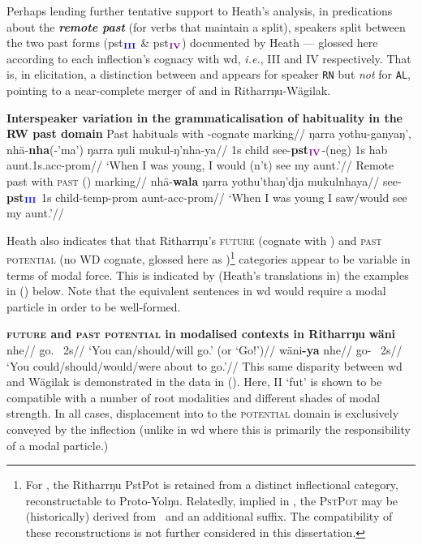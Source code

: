 Perhaps lending further tentative support to Heath's analysis, in predications about the \textbf{\textit{remote past}} (for verbs that maintain a split), speakers split between the two past forms (\gls{pst}$ _{\textbf{\textcolor{blue}{III}}} $ \& \gls{pst}$ _{\textbf{\textcolor{violet}{IV}}} $) documented by Heath --- glossed here according to each inflection's cognacy with \gls{wd}, \textit{i.e.}, \gls{III} and \gls{IV} respectively.
That is, in elicitation, a distinction between \III{} and \IV{} appears for speaker \texttt{RN} but \textit{not} for \texttt{AL}, pointing to a near-complete merger of \III{} and \IV{} in Ritharrŋu-Wägilak.

\pex \textbf{Interspeaker variation in the grammaticalisation of habituality in the RW past domain}
\a\begingl\glpreamble Past habituals with \IV-cognate marking//
 \gla ŋarra yothu-ganyaŋ', nhä-\textbf{nha}(-'ma') ŋarra ŋuli mukul-ŋ'nha-ya//
\glb 1s child see-\textbf{\gls{pst}}$_{\textbf{\textcolor{violet}{IV}}}$-(\gls{neg}) 1s \gls{hab} aunt.1s.\gls{acc}-\gls{prom}//
\glft`When I was young, I would (n't) see my aunt.'\trailingcitation{[RN~20190522]}//\endgl
\a\begingl\glpreamble Remote past with \textsc{past} (\III) marking//
\gla nhä-\textbf{wala} ŋarra yothu'thaŋ'dja mukulnhaya//
\glb see-\textbf{\gls{pst}}$_{\textbf{\textcolor{blue}{III}}}$ 1s child-\gls{temp}-\gls{prom} aunt-\gls{acc}-\gls{prom}//
\glft `When I was young I saw/would see my aunt.'\trailingcitation{[AL~20190522]}//\endgl
\xe




Heath also indicates that that Ritharrŋu's \textsc{future} (cognate with \II) and \textsc{past potential} (no WD cognate, glossed here as \V)\footnote{For \citet{Bowern2009}, the Ritharrŋu \gls{PstPot} is retained from a distinct inflectional category, reconstructable to Proto-Yolŋu. Relatedly, implied in \citet[20,23,104]{Heath1980r}, the \textsc{PstPot} may be (historically) derived from \II~and an additional suffix. The compatibility of these reconstructions is not further considered in this dissertation.} categories appear to be variable in terms of modal force. This is indicated by (Heath's translations in) the examples in (\nextx) below. Note that the equivalent sentences in \gls{wd} would require a modal particle in order to be well-formed.

\pex \textbf{\textsc{future} and \textsc{past potential} in modalised contexts in Ritharrŋu}
\a\begingl\gla {}\textbf{wäni} nhe//
\glb go.\II~ 2s//
\glft `You can/should/will go.' (or `Go!')//\endgl
\a\begingl\gla {}wäni\textbf{-ya} nhe//
\glb go-\V~ 2s//
\glft`You could/should/would/were about to go.'//\endgl
\xe
This same disparity between \gls{wd} and Wägilak is demonstrated in the data in (\nextx). Here, \gls{II} `\gls{fut}' is shown to be compatible with a number of root modalities and different shades of modal strength. In all cases, displacement into to the \textsc{potential} domain is exclusively conveyed by the inflection (unlike in \gls{wd} where this is primarily the responsibility of a modal particle.)

